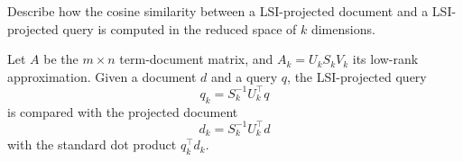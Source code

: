 \exercise

Describe how the cosine similarity between a LSI-projected document and a
LSI-projected query is computed in the reduced space of $k$ dimensions.

\solution

Let $A$ be the $m \times n$ term-document matrix, and $A_k = U_kS_kV_k$
its low-rank approximation. Given a document $d$ and a query $q$, the
LSI-projected query
%
$$q_k = S_k^{-1} U_k^\top q$$
%
is compared with the projected document
%
$$d_k = S_k^{-1} U_k^\top d$$
%
with the standard dot product $q_k^\top d_k$.